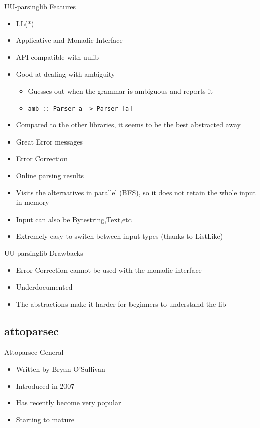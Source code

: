 \documentclass{beamer}
\begin{document}
\begin{frame}[fragile]{UU-parsinglib Features}
\begin{itemize}
\item LL(*)
\item Applicative and Monadic Interface
\item API-compatible with uulib
\item Good at dealing with ambiguity
  \begin{itemize}
    \item Guesses out when the grammar is ambiguous and reports it
    \item \verb|amb :: Parser a -> Parser [a]|
  \end{itemize}
\item Compared to the other libraries, it seems to be the best abstracted away
\item Great Error messages
\item Error Correction
\item Online parsing results
\item Visits the alternatives in parallel (BFS), so it does not retain the whole input in memory
\item Input can also be Bytestring,Text,etc
\item Extremely easy to switch between input types (thanks to ListLike)
\end{itemize}
\end{frame}

\begin{frame}{UU-parsinglib Drawbacks}
\begin{itemize}
\item Error Correction cannot be used with the monadic interface
\item Underdocumented
\item The abstractions make it harder for beginners to understand the lib
\end{itemize}
\end{frame}

\subsection{attoparsec}

\begin{frame}{Attoparsec General}
\begin{itemize}
\item Written by Bryan O'Sullivan
\item Introduced in 2007
\item Has recently become very popular
\item Starting to mature
\end{itemize}
\end{frame}
\end{document}
